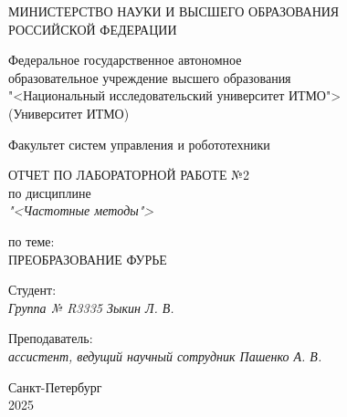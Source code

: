 \thispagestyle{empty}

\begin{center}
    МИНИСТЕРСТВО НАУКИ И ВЫСШЕГО ОБРАЗОВАНИЯ \\ РОССИЙСКОЙ ФЕДЕРАЦИИ

    \vspace{20pt}

    Федеральное государственное автономное \\ образовательное учреждение высшего образования \\
    "<Национальный исследовательский университет ИТМО"> \\
    (Университет ИТМО)

    \vspace{20pt}

    Факультет систем управления и робототехники
\end{center}

\vfill

\begin{center}
    ОТЧЕТ ПО ЛАБОРАТОРНОЙ РАБОТЕ №2\\  
    по дисциплине \\
    \textit{"<Частотные методы">}

    \vspace{20pt}

    по теме: \\
    \uppercase{Преобразование Фурье}
\end{center}

\vfill

    \noindent Студент: \\
    \textit{Группа № R3335 \hfill Зыкин Л. В.}

    \vspace{20pt}

    \noindent Преподаватель: \\
    \textit{ассистент, ведущий научный сотрудник \hfill Пашенко А. В.}

\vfill

\begin{center}
    Санкт-Петербург \\ 2025
\end{center}